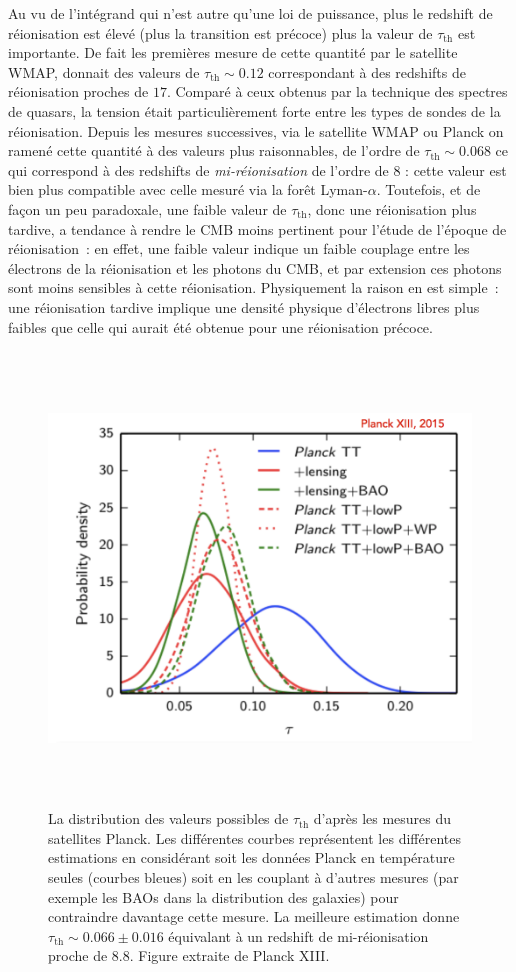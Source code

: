 Au vu de l'intégrand qui n'est autre qu'une loi de puissance, plus le redshift de réionisation est élevé (plus la transition est précoce) plus la valeur de $\tau_\mathrm{th}$ est importante. De fait les premières mesure de cette quantité par le satellite WMAP, donnait des valeurs de $\tau_\mathrm{th}\sim 0.12$ correspondant à des redshifts de réionisation proches de $17$. Comparé à ceux obtenus par la technique des spectres de quasars, la tension était particulièrement forte entre les types de sondes de la réionisation. Depuis les mesures successives, via le satellite WMAP ou Planck on ramené cette quantité à des valeurs plus raisonnables, de l'ordre de $\tau_\mathrm{th}\sim 0.068$ ce qui correspond à des redshifts de \textit{mi-réionisation} de l'ordre de 8 : cette valeur est bien plus compatible avec celle mesuré via la forêt Lyman-$\alpha$. Toutefois, et de façon un peu paradoxale, une faible valeur de $\tau_\mathrm{th}$, donc une réionisation plus tardive, a tendance à rendre le CMB moins pertinent pour l'étude de l'époque de réionisation~: en effet, une faible valeur indique un faible couplage entre les électrons de la réionisation et les photons du CMB, et par extension ces photons sont moins sensibles à cette réionisation. Physiquement la raison en est simple~: une réionisation tardive implique une densité physique d'électrons libres plus faibles que celle qui aurait été obtenue pour une réionisation précoce.

\begin{figure}[htbp]
	\centering
		\includegraphics[height=12cm]{figs/tau.png}
		\caption[L'opacité Thomson du CMB]{La distribution des valeurs possibles de $\tau_\mathrm{th}$ d'après les mesures du satellites Planck. Les différentes courbes représentent les différentes estimations en considérant soit les données Planck en température seules (courbes bleues) soit en les couplant à d'autres mesures (par exemple les BAOs dans la distribution des galaxies) pour contraindre davantage cette mesure. La meilleure estimation donne $\tau_\mathrm{th}\sim 0.066 \pm 0.016$ équivalant à un redshift de mi-réionisation proche de 8.8. Figure extraite de Planck XIII.}
	\label{f:tau}
\end{figure}

